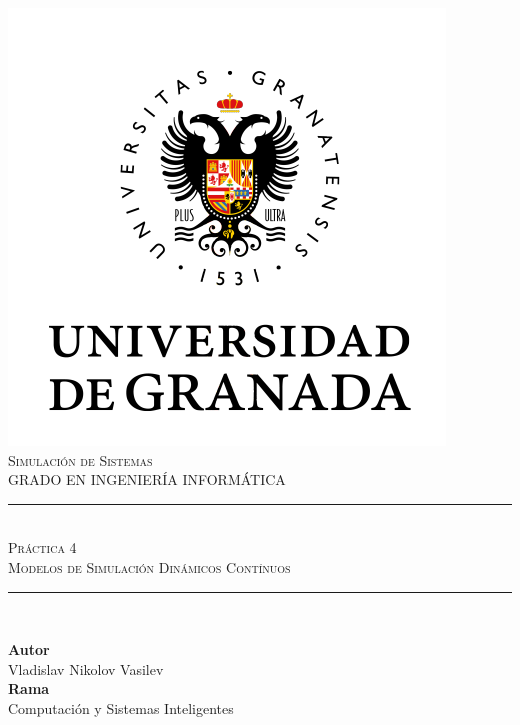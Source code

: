 \documentclass[11pt,a4paper]{article}
\newcommand{\asignatura}{Simulación de Sistemas}
\newcommand{\autor}{Vladislav Nikolov Vasilev}
\newcommand{\titulo}{Práctica 4}
\newcommand{\subtitulo}{Modelos de Simulación Dinámicos Contínuos}
\begin{document}

\begin{titlepage}

\begin{minipage}{\textwidth}

\centering

\includegraphics[scale=0.5]{img/ugr.png}\\

\textsc{\Large \asignatura{}\\[0.2cm]}
\textsc{GRADO EN INGENIERÍA INFORMÁTICA}\\[1cm]

\noindent\rule[-1ex]{\textwidth}{1pt}\\[1.5ex]
\textsc{{\Huge \titulo\\[0.5ex]}}
\textsc{{\Large \subtitulo\\}}
\noindent\rule[-1ex]{\textwidth}{2pt}\\[3.5ex]

\end{minipage}

\vspace{0.5cm}

\begin{minipage}{\textwidth}

\centering

\textbf{Autor}\\ {\autor{}}\\[2.5ex]
\textbf{Rama}\\ {Computación y Sistemas Inteligentes}\\[2.5ex]
\vspace{0.3cm}


\end{minipage}
\end{titlepage}
\end{document}
